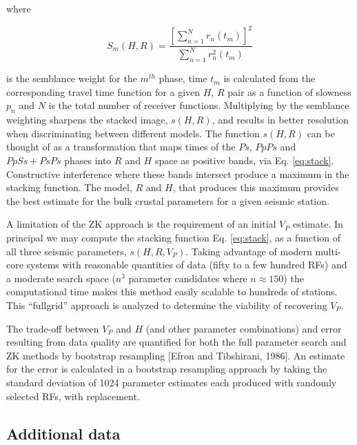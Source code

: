 \documentclass[draft, 12pt]{article}
\begin{document}
\noindent where

\begin{equation}
S_m(H,R) = \frac {\left[ \sum_{n=1}^N r_n(t_m) \right]^2}
                 { \sum_{n=1}^N r_n^2(t_m) }
\end{equation}

\noindent is the semblance weight for the $m^{th}$ phase, time $t_m$ is calculated from the corresponding travel time function for a given $H$, $R$ pair as a function of slowness $p_n$ and $N$ is the total number of receiver functions. Multiplying by the semblance weighting sharpens the stacked image, $s(H,R)$, and results in better resolution when discriminating between different models. The function $s(H,R)$ can be thought of as a transformation that maps times of the $Ps$, $PpPs$ and $PpSs+PsPs$ phases into $R$ and $H$ space as positive bands, via Eq. \ref{eq:stack}. Constructive interference where these bands intersect produce a maximum in the stacking function. The model, $R$ and $H$, that produces this maximum provides the best estimate for the bulk crustal parameters for a given seismic station.

A limitation of the ZK approach is the requirement of an initial $V_P$ estimate. In principal we may compute the stacking function Eq. \ref{eq:stack}, as a function of all three seismic parameters, $s(H,R,V_P)$. Taking advantage of modern multi-core systems with reasonable quantities of data (fifty to a few hundred RFs) and a moderate search space ($n^3$ parameter candidates where $n \approx 150$) the computational time makes this method easily scalable to hundreds of stations. This ``fullgrid'' approach is analyzed to determine the viability of recovering $V_P$.

The trade-off between $V_P$ and $H$ (and other parameter combinations) and error resulting from data quality are quantified for both the full parameter search and ZK methods by bootstrap resampling [Efron and Tibshirani, 1986]. An estimate for the error is calculated in a bootstrap resampling approach by taking the standard deviation of 1024 parameter estimates each produced with randomly selected RFs, with replacement.

\subsection{Additional data}
\end{document}
